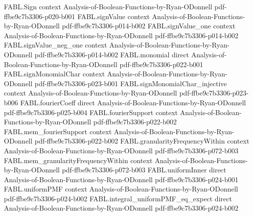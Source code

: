 \begin{theorem}
\label{FABL.FiniteFourierBasis.productCoordinateLaplacian_fourier_expansion}
\leanok
{}
\proofstep
  {FABL.Sign}
  {context}
  {Analysis-of-Boolean-Functions-by-Ryan-ODonnell}
  {pdf-ffbe9c7b3306-p020-b001}
\proofstep
  {FABL.signValue}
  {context}
  {Analysis-of-Boolean-Functions-by-Ryan-ODonnell}
  {pdf-ffbe9c7b3306-p014-b002}
\proofstep
  {FABL.signValue_one}
  {context}
  {Analysis-of-Boolean-Functions-by-Ryan-ODonnell}
  {pdf-ffbe9c7b3306-p014-b002}
\proofstep
  {FABL.signValue_neg_one}
  {context}
  {Analysis-of-Boolean-Functions-by-Ryan-ODonnell}
  {pdf-ffbe9c7b3306-p014-b002}
\proofstep
  {FABL.monomial}
  {direct}
  {Analysis-of-Boolean-Functions-by-Ryan-ODonnell}
  {pdf-ffbe9c7b3306-p022-b001}
\proofstep
  {FABL.signMonomialChar}
  {context}
  {Analysis-of-Boolean-Functions-by-Ryan-ODonnell}
  {pdf-ffbe9c7b3306-p023-b001}
\proofstep
  {FABL.signMonomialChar_injective}
  {context}
  {Analysis-of-Boolean-Functions-by-Ryan-ODonnell}
  {pdf-ffbe9c7b3306-p023-b006}
\proofstep
  {FABL.fourierCoeff}
  {direct}
  {Analysis-of-Boolean-Functions-by-Ryan-ODonnell}
  {pdf-ffbe9c7b3306-p025-b004}
\proofstep
  {FABL.fourierSupport}
  {context}
  {Analysis-of-Boolean-Functions-by-Ryan-ODonnell}
  {pdf-ffbe9c7b3306-p022-b002}
\proofstep
  {FABL.mem_fourierSupport}
  {context}
  {Analysis-of-Boolean-Functions-by-Ryan-ODonnell}
  {pdf-ffbe9c7b3306-p022-b002}
\proofstep
  {FABL.granularityFrequencyWithin}
  {context}
  {Analysis-of-Boolean-Functions-by-Ryan-ODonnell}
  {pdf-ffbe9c7b3306-p072-b003}
\proofstep
  {FABL.mem_granularityFrequencyWithin}
  {context}
  {Analysis-of-Boolean-Functions-by-Ryan-ODonnell}
  {pdf-ffbe9c7b3306-p072-b003}
\proofstep
  {FABL.uniformInner}
  {direct}
  {Analysis-of-Boolean-Functions-by-Ryan-ODonnell}
  {pdf-ffbe9c7b3306-p024-b001}
\proofstep
  {FABL.uniformPMF}
  {context}
  {Analysis-of-Boolean-Functions-by-Ryan-ODonnell}
  {pdf-ffbe9c7b3306-p024-b002}
\proofstep
  {FABL.integral_uniformPMF_eq_expect}
  {direct}
  {Analysis-of-Boolean-Functions-by-Ryan-ODonnell}
  {pdf-ffbe9c7b3306-p024-b002}
\proofstep

\end{theorem}
